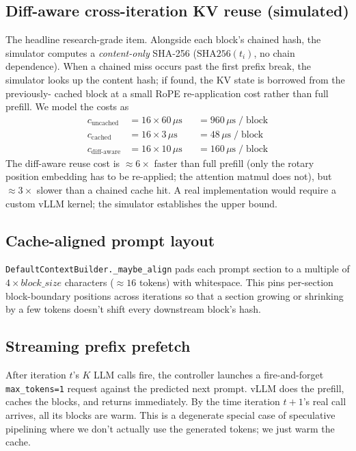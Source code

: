 \documentclass[11pt]{article}
\begin{document}
\subsection{Diff-aware cross-iteration KV reuse (simulated)}
\label{sec:approach-diff-aware}

The headline research-grade item. Alongside each block's chained
hash, the simulator computes a \emph{content-only} SHA-256
($\mathrm{SHA256}(t_i)$, no chain dependence). When a chained miss
occurs past the first prefix break, the simulator looks up the
content hash; if found, the KV state is borrowed from the previously-
cached block at a small RoPE re-application cost rather than full
prefill. We model the costs as
\begin{align*}
  c_\text{uncached} &= 16 \times 60\,\mu\mathrm{s}  &&= 960\,\mu\mathrm{s}\;/\;\mathrm{block} \\
  c_\text{cached}   &= 16 \times  3\,\mu\mathrm{s}  &&=  48\,\mu\mathrm{s}\;/\;\mathrm{block} \\
  c_\text{diff-aware} &= 16 \times 10\,\mu\mathrm{s} &&= 160\,\mu\mathrm{s}\;/\;\mathrm{block}
\end{align*}
The diff-aware reuse cost is $\approx 6\times$ faster than full
prefill (only the rotary position embedding has to be re-applied;
the attention matmul does not), but $\approx 3\times$ slower than a
chained cache hit. A real implementation would require a custom
vLLM kernel; the simulator establishes the upper bound.

\subsection{Cache-aligned prompt layout}

\verb|DefaultContextBuilder._maybe_align| pads each prompt section to
a multiple of $4\times\textit{block\_size}$ characters ($\approx 16$
tokens) with whitespace. This pins per-section block-boundary
positions across iterations so that a section growing or shrinking by
a few tokens doesn't shift every downstream block's hash.

\subsection{Streaming prefix prefetch}

After iteration $t$'s $K$ LLM calls fire, the controller launches a
fire-and-forget \verb|max_tokens=1| request against the predicted
next prompt. vLLM does the prefill, caches the blocks, and returns
immediately. By the time iteration $t{+}1$'s real call arrives, all
its blocks are warm. This is a degenerate special case of speculative
pipelining where we don't actually use the generated tokens; we just
warm the cache.
\end{document}
